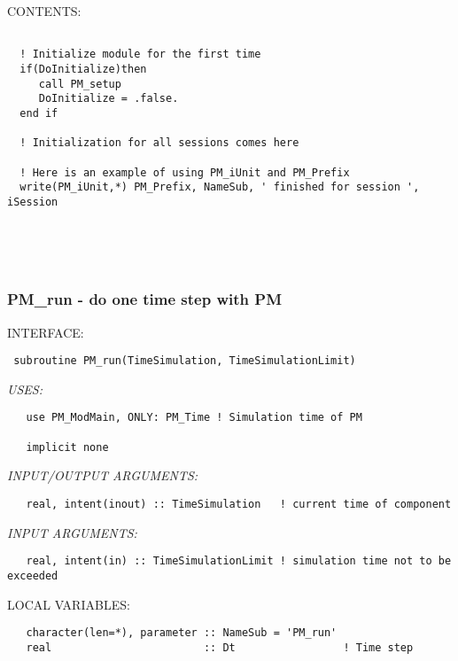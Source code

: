 
\bigskip
{\sf CONTENTS:}
\begin{verbatim}

  ! Initialize module for the first time
  if(DoInitialize)then
     call PM_setup
     DoInitialize = .false.
  end if

  ! Initialization for all sessions comes here

  ! Here is an example of using PM_iUnit and PM_Prefix
  write(PM_iUnit,*) PM_Prefix, NameSub, ' finished for session ', iSession

 
\end{verbatim}
 
 
\mbox{}\hrulefill\ 
 
\newpage


\subsubsection{ PM\_run - do one time step with PM }


\bigskip
{\sf INTERFACE:}
\begin{verbatim} subroutine PM_run(TimeSimulation, TimeSimulationLimit)
 \end{verbatim}
{\em USES:}
\begin{verbatim}   use PM_ModMain, ONLY: PM_Time ! Simulation time of PM
 
   implicit none
 \end{verbatim}
{\em INPUT/OUTPUT ARGUMENTS:}
\begin{verbatim}   real, intent(inout) :: TimeSimulation   ! current time of component
 \end{verbatim}
{\em INPUT ARGUMENTS:}
\begin{verbatim}   real, intent(in) :: TimeSimulationLimit ! simulation time not to be exceeded
 \end{verbatim}
{\sf LOCAL VARIABLES:}
\begin{verbatim}   character(len=*), parameter :: NameSub = 'PM_run'
   real                        :: Dt                 ! Time step\end{verbatim}




